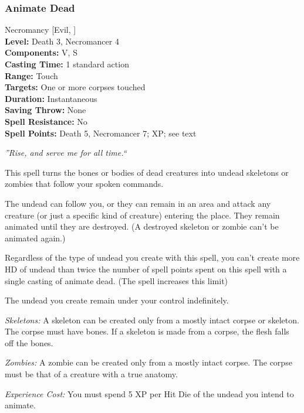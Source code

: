 \subsubsection{Animate Dead}
\label{Spell:AnimateDead}
Necromancy [Evil, ]
\\ \textbf{Level:} Death 3, Necromancer 4
\\ \textbf{Components:} V, S
\\ \textbf{Casting Time:} 1 standard action
\\ \textbf{Range:} Touch
\\ \textbf{Targets:} One or more corpses touched
\\ \textbf{Duration:} Instantaneous
\\ \textbf{Saving Throw:} None
\\ \textbf{Spell Resistance:} No
\\ \textbf{Spell Points:} Death 5, Necromancer 7; XP; see text

\emph{''Rise, and serve me for all time.``}

This spell turns the bones or bodies of dead creatures into undead skeletons or zombies that follow your spoken commands.

The undead can follow you, or they can remain in an area and attack any creature (or just a specific kind of creature) entering the place. 
They remain animated until they are destroyed. (A destroyed skeleton or zombie can't be animated again.)

Regardless of the type of undead you create with this spell, 
you can't create more HD of undead than twice the number
of spell points spent on this spell with a single casting of animate dead. (The  spell increases this limit)

The undead you create remain under your control indefinitely.

\begin{list}{}{\leftmargin=1em}
 \item \emph{Skeletons:}
A skeleton can be created only from a mostly intact corpse or skeleton. 
The corpse must have bones. 
If a skeleton is made from a corpse, the flesh falls off the bones.
 \item \emph{Zombies:}
A zombie can be created only from a mostly intact corpse. 
The corpse must be that of a creature with a true anatomy.
\end{list}

\emph{Experience Cost:} You must spend 5 XP per Hit Die of the undead you intend to animate.
